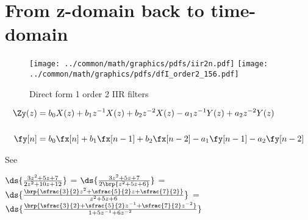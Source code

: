 \section{From z-domain back to time-domain}
\begin{figure}
  \centering
  \texttt{[image: ../common/math/graphics/pdfs/iir2n.pdf]}
  \texttt{[image: ../common/math/graphics/pdfs/dfI\_order2\_156.pdf]}
  \caption{Direct form 1 order 2 IIR filters\label{fig:df1iir2}}
\end{figure}
\begin{align*}
 \Zy(z) &=  b_0X(z) + b_1z^{-1}X(z)  + b_2z^{-2}X(z) - a_1 z^{-1}Y(z) + a_2z^{-2}Y(z)
  \\\\
  \fy[n] &= b_0\fx[n] + b_1\fx[n-1] + b_2\fx[n-2] - a_1\fy[n-1] - a_2\fy[n-2]
\end{align*}

\begin{example}
See 

$\ds{\frac{3z^2 + 5z + 7}{2z^2 + 10z + 12}}$
=
$\ds{\frac{3z^2 + 5z + 7}{2\brp{z^2 + 5z + 6}}}$
=
$\ds{\frac{\brp{\sfrac{3}{2}z^2 + \sfrac{5}{2}z + \sfrac{7}{2}}}
               {z^2 + 5z + 6}}$
=
$\ds{\frac{\brp{\sfrac{3}{2} + \sfrac{5}{2}z^{-1} + \sfrac{7}{2}z^{-2}}}
               {1 + 5z^{-1} + 6z^{-2}}}$
\end{example}

